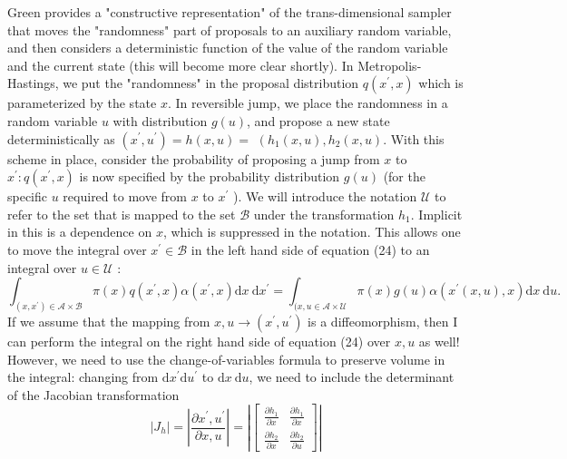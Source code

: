 \documentclass[11pt]{article}
\begin{document}
Green provides a "constructive representation" of the trans-dimensional sampler that moves the "randomness" part of proposals to an auxiliary random variable, and then considers a deterministic function of the value of the random variable and the current state (this will become more clear shortly). In Metropolis-Hastings, we put the "randomness" in the proposal distribution $q\left(x^{\prime}, x\right)$ which is parameterized by the state $x$. In reversible jump, we place the randomness in a random variable $u$ with distribution $g(u)$, and propose a new state deterministically as $\left(x^{\prime}, u^{\prime}\right)=h(x, u)=$ $\left(h_{1}(x, u), h_{2}(x, u)\right.$. With this scheme in place, consider the probability of proposing a jump from $x$ to $x^{\prime}: q\left(x^{\prime}, x\right)$ is now specified by the probability distribution $g(u)$ (for the specific $u$ required to move from $x$ to $x^{\prime}$ ). We will introduce the notation $\mathcal{U}$ to refer to the set that is mapped to the set $\mathcal{B}$ under the transformation $h_{1}$. Implicit in this is a dependence on $x$, which is suppressed in the notation. This allows one to move the integral over $x^{\prime} \in \mathcal{B}$ in the left hand side of equation (24) to an integral over $u \in \mathcal{U}$ :
\begin{equation}
\int_{\left(x, x^{\prime}\right) \in \mathcal{A} \times \mathcal{B}} \pi(x) q\left(x^{\prime}, x\right) \alpha\left(x^{\prime}, x\right) \mathrm{d} x \mathrm{~d} x^{\prime}=\int_{(x, u \in \mathcal{A} \times \mathcal{U}} \pi(x) g(u) \alpha\left(x^{\prime}(x, u), x\right) \mathrm{d} x \mathrm{~d} u .
\end{equation}
If we assume that the mapping from $x, u \rightarrow\left(x^{\prime}, u^{\prime}\right)$ is a diffeomorphism, then I can perform the integral on the right hand side of equation (24) over $x, u$ as well! However, we need to use the change-of-variables formula to preserve volume in the integral: changing from $\mathrm{d} x^{\prime} \mathrm{d} u^{\prime}$ to $\mathrm{d} x \mathrm{~d} u$, we need to include the determinant of the Jacobian transformation
\begin{equation}
\left|J_{h}\right|=\left|\frac{\partial x^{\prime}, u^{\prime}}{\partial x, u}\right|=\left|\left[\begin{array}{ll}
	\frac{\partial h_{1}}{\partial x} & \frac{\partial h_{1}}{\partial x} \\
	\frac{\partial h_{2}}{\partial x} & \frac{\partial h_{2}}{\partial u}
\end{array}\right]\right|
\end{equation}
\end{document}
